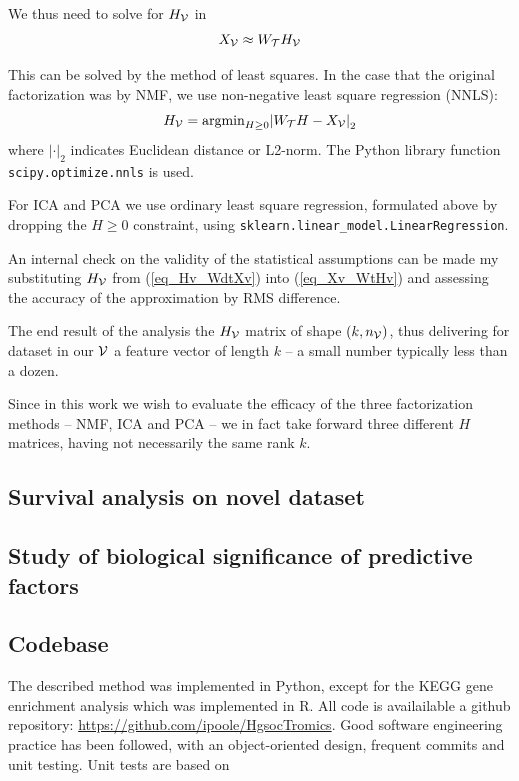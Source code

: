 \documentclass[tikz, 12pt,a4paper,oneside,fleqn]{article}
\begin{document}
We thus need to solve for $H_{\mathcal{V}}$ in
\begin{equation}
	X_{\mathcal{V}}  \approx  W_{\mathcal{T}} H_{\mathcal{V}} \label{eq_Xv_WtHv}
\end{equation}

This can be solved by the method of least squares.  In the case that the original factorization was by NMF, we use non-negative least square regression (NNLS):
\begin{equation}
	H_{\mathcal{V}} = \mbox{argmin}_{H\geq 0}{\lvert W_{\mathcal{T}} H - X_{\mathcal{V}} \rvert}_2
	\label{eq_Hv_WdtXv}
\end{equation}
where ${\lvert \mathbf{\cdot} \rvert}_2$ indicates Euclidean distance or L2-norm.
The Python library function {\tt scipy.optimize.nnls} is used.

For ICA and PCA we use ordinary least square regression, formulated above by dropping the $H\geq 0$ constraint, using {\tt sklearn.linear\_model.LinearRegression}.

An internal check on the validity of the statistical assumptions can be made my substituting  $H_{\mathcal{V}}$ from (\ref{eq_Hv_WdtXv}) into (\ref{eq_Xv_WtHv}) and assessing the accuracy of the approximation by RMS difference.

The end result of the analysis the $H_{\mathcal{V}}$ matrix of shape $(k, n_{\mathcal{V}})$, thus delivering for dataset in our $\mathcal{V}$ a feature vector of length $k$ -- a small number typically less than a dozen.

Since in this work we wish to evaluate the efficacy of the three factorization methods -- NMF, ICA and PCA -- we in fact take forward three different $H$ matrices, having not necessarily the same rank $k$.

\subsection{Survival analysis on novel dataset}

\subsection{Study of biological significance of predictive factors}

\subsection{Codebase}

The described method was implemented in Python, except for the KEGG gene enrichment analysis which was implemented in R.  All code is availailable a github repository: \url{https://github.com/ipoole/HgsocTromics}.  Good software engineering practice has been followed, with an object-oriented design, frequent commits and unit testing.  Unit tests are based on 
\end{document}
